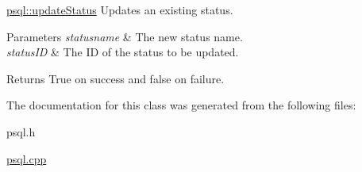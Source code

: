 \hyperlink{classpsql_a620364c99c98e20720908deb045536a0}{psql\+::update\+Status} Updates an existing status. 


\begin{DoxyParams}{Parameters}
{\em statusname} & The new status name. \\
\hline
{\em status\+ID} & The ID of the status to be updated. \\
\hline
\end{DoxyParams}
\begin{DoxyReturn}{Returns}
True on success and false on failure. 
\end{DoxyReturn}


The documentation for this class was generated from the following files\+:\begin{DoxyCompactItemize}
\item 
psql.\+h\item 
\hyperlink{psql_8cpp}{psql.\+cpp}\end{DoxyCompactItemize}
